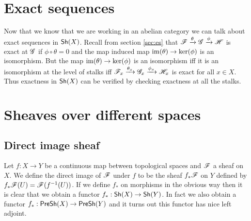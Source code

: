 \documentclass{memoir}
\begin{document}
\section{Exact sequences}
Now that we know that we are working in an abelian category we can talk about exact sequences in ${\normalfont\mathsf{Sh}}(X)$.
Recall from section \ref{sec:es} that $\mathscr{F}\xrightarrow{\theta}\mathscr{G}\xrightarrow{\phi}\mathscr{H}$ is exact at $\mathscr{G}$ if $\phi\circ\theta=0$ and the map induced map $\operatorname{im}(\theta)\to\ker(\phi)$ is an isomorphism.
But the map $\operatorname{im}(\theta)\to\ker(\phi)$ is an isomorphism iff it is an isomorphism at the level of stalks iff $\mathscr{F}_x\xrightarrow{\theta_x}\mathscr{G}_x\xrightarrow{\phi_x}\mathscr{H}_x$ is exact for all $x\in X$.
Thus exactness in ${\normalfont\mathsf{Sh}}(X)$ can be verified by checking exactness at all the stalks.
\section{Sheaves over different spaces}
\subsection{Direct image sheaf}
Let $f:X\to Y$ be a continuous map between topological spaces and $\mathscr{F}$ a sheaf on $X$.
We define the direct image of $\mathscr{F}$ under $f$ to be the sheaf $f_*\mathscr{F}$ on $Y$ defined by $f_*\mathscr{F}(U) = \mathscr{F}(f^{-1}(U))$.
If we define $f_*$ on morphisms in the obvious way then it is clear that we obtain a functor $f_*:{\normalfont\mathsf{Sh}}(X)\to{\normalfont\mathsf{Sh}}(Y)$.
In fact we also obtain a functor $f_*:{\normalfont\mathsf{PreSh}}(X)\to{\normalfont\mathsf{PreSh}}(Y)$ and it turns out this functor has nice left adjoint.
\end{document}
